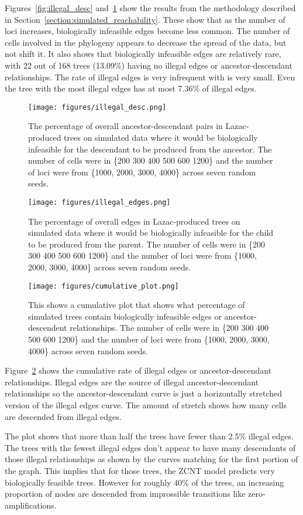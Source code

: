 Figures~\ref{fig:illegal_desc} and~\ref{fig:illegal_edges} show the results from the methodology described in Section~\ref{section:simulated_reachability}. These show that as the number of loci increases, biologically infeasible edges become less common. The number of cells involved in the phylogeny appears to decrease the spread of the data, but not shift it. It also shows that biologically infeasible edges are relatively rare, with 22 out of 168 trees (13.09\%) having no illegal edges or ancestor-descendant relationships. The rate of illegal edges is very infrequent with is very small. Even the tree with the most illegal edges has at most 7.36\% of illegal edges. 

\begin{figure}[ht]
    \centering
    \texttt{[image: figures/illegal\_desc.png]} 
    \caption{The percentage of overall ancestor-descendant pairs in Lazac-produced trees on simulated data where it would be biologically infeasible for the descendant to be produced from the ancestor. The number of cells were in \{200 300 400 500 600 1200\} and the number of loci were from \{1000, 2000, 3000, 4000\} across seven random seeds.}
\end{figure}\label{fig:illegal_desc}

\begin{figure}[ht]
    \centering
    \texttt{[image: figures/illegal\_edges.png]}
    \caption{The percentage of overall edges in Lazac-produced trees on simulated data where it would be biologically infeasible for the child to be produced from the parent. The number of cells were in \{200 300 400 500 600 1200\} and the number of loci were from \{1000, 2000, 3000, 4000\} across seven random seeds.}\label{fig:illegal_edges}
\end{figure}

\begin{figure}[ht]
    \centering
    \texttt{[image: figures/cumulative\_plot.png]}
    \caption{This shows a cumulative plot that shows what percentage of simulated trees contain biologically infeasible edges or ancestor-descendent relationships. The number of cells were in \{200 300 400 500 600 1200\} and the number of loci were from \{1000, 2000, 3000, 4000\} across seven random seeds.}\label{fig:cumulative_trees}
\end{figure}

Figure~\ref{fig:cumulative_trees} shows the cumulative rate of illegal edges or ancestor-descendant relationships. Illegal edges are the source of illegal ancestor-descendant relationships so the ancestor-descendant curve is just a horizontally stretched version of the illegal edges curve. The amount of stretch shows how many cells are descended from illegal edges. 

The plot shows that more than half the trees have fewer than 2.5\% illegal edges. The trees with the fewest illegal edges don't appear to have many descendants of those illegal relationships as shown by the curves matching for the first portion of the graph. This implies that for those trees, the ZCNT model predicts very biologically feasible trees. However for roughly 40\% of the trees, an increasing proportion of nodes are descended from improssible transitions like zero-amplifications. 